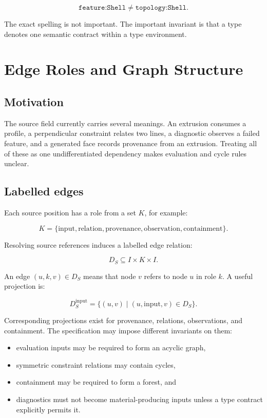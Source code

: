 \documentclass[11pt]{article}
\newcommand{\Type}[1]{\texttt{#1}}
\begin{document}
\[
\Type{feature:Shell}\neq\Type{topology:Shell}.
\]

The exact spelling is not important. The important invariant is that a type
denotes one semantic contract within a type environment.

\section{Edge Roles and Graph Structure}

\subsection{Motivation}

The source field currently carries several meanings. An extrusion consumes a
profile, a perpendicular constraint relates two lines, a diagnostic observes a
failed feature, and a generated face records provenance from an extrusion.
Treating all of these as one undifferentiated dependency makes evaluation and
cycle rules unclear.

\subsection{Labelled edges}

Each source position has a role from a set $K$, for example:

\[
K=\{\mathrm{input},\mathrm{relation},\mathrm{provenance},
     \mathrm{observation},\mathrm{containment}\}.
\]

Resolving source references induces a labelled edge relation:

\[
D_S\subseteq I\times K\times I.
\]

An edge $(u,k,v)\in D_S$ means that node $v$ refers to node $u$ in role $k$.
A useful projection is:

\[
D_S^{\mathrm{input}}
=
\{(u,v)\mid(u,\mathrm{input},v)\in D_S\}.
\]

Corresponding projections exist for provenance, relations, observations, and
containment. The specification may impose different invariants on them:

\begin{itemize}
  \item evaluation inputs may be required to form an acyclic graph,
  \item symmetric constraint relations may contain cycles,
  \item containment may be required to form a forest, and
  \item diagnostics must not become material-producing inputs unless a type
    contract explicitly permits it.
\end{itemize}
\end{document}
